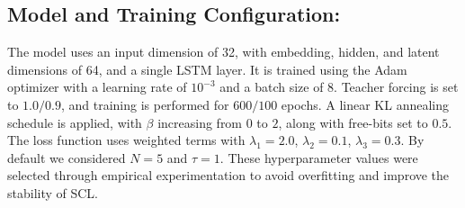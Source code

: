 \documentclass[conference]{IEEEtran}
\begin{document}
\subsection{\textbf{Model and Training Configuration:}}
The model uses an input dimension of 32, with embedding, hidden, and latent dimensions of 64, and a single LSTM layer. It is trained using the Adam optimizer with a learning rate of $10^{-3}$ and a batch size of 8. Teacher forcing is set to $1.0/0.9$, and training is performed for $600/100$ epochs. A linear KL annealing schedule is applied, with $\beta$ increasing from $0$ to $2$, along with free-bits set to $0.5$. The loss function uses weighted terms with $\lambda_1 = 2.0$, $\lambda_2 = 0.1$, $\lambda_3= 0.3$.
By default we considered $N=5$ and $\tau=1$. 
These hyperparameter values were selected through empirical experimentation to avoid overfitting and improve the stability of SCL.

\end{document}
